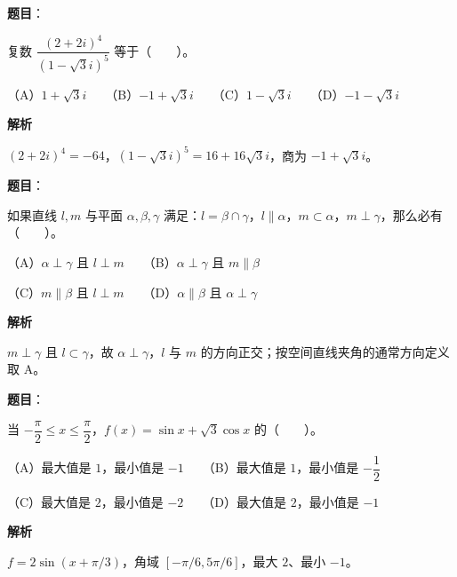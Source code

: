 \begin{answer}

\textbf{题目}：

复数 $\dfrac{(2+2i)^4}{(1-\sqrt{3}i)^5}$ 等于\mbox{（　　）}。

（A）$1+\sqrt{3}i$　　（B）$-1+\sqrt{3}i$　　（C）$1-\sqrt{3}i$　　（D）$-1-\sqrt{3}i$

\textbf{解析}

$(2+2i)^4=-64$，$(1-\sqrt3i)^5=16+16\sqrt3i$，商为 $-1+\sqrt3i$。


\end{answer}
\begin{answer}

\textbf{题目}：

如果直线 $l,m$ 与平面 $\alpha,\beta,\gamma$ 满足：$l=\beta\cap\gamma$，$l\parallel\alpha$，$m\subset\alpha$，$m\perp\gamma$，那么必有\mbox{（　　）}。

（A）$\alpha\perp\gamma$ 且 $l\perp m$　　（B）$\alpha\perp\gamma$ 且 $m\parallel\beta$

（C）$m\parallel\beta$ 且 $l\perp m$　　（D）$\alpha\parallel\beta$ 且 $\alpha\perp\gamma$

\textbf{解析}

$m\perp\gamma$ 且 $l\subset\gamma$，故 $\alpha\perp\gamma$，$l$ 与 $m$ 的方向正交；按空间直线夹角的通常方向定义取 A。


\end{answer}
\begin{answer}

\textbf{题目}：

当 $-\dfrac{\pi}{2}\le x\le\dfrac{\pi}{2}$，$f(x)=\sin x+\sqrt{3}\cos x$ 的\mbox{（　　）}。

（A）最大值是 $1$，最小值是 $-1$　　（B）最大值是 $1$，最小值是 $-\dfrac12$

（C）最大值是 $2$，最小值是 $-2$　　（D）最大值是 $2$，最小值是 $-1$

\textbf{解析}

$f=2\sin(x+\pi/3)$，角域 $[-\pi/6,5\pi/6]$，最大 $2$、最小 $-1$。


\end{answer}
